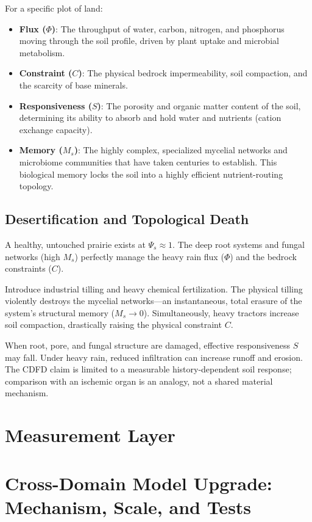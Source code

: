 \documentclass[11pt,a4paper]{article}
\begin{document}
For a specific plot of land:
\begin{itemize}
    \item \textbf{Flux ($\Phi$)}: The throughput of water, carbon, nitrogen, and phosphorus moving through the soil profile, driven by plant uptake and microbial metabolism.
    \item \textbf{Constraint ($C$)}: The physical bedrock impermeability, soil compaction, and the scarcity of base minerals.
    \item \textbf{Responsiveness ($S$)}: The porosity and organic matter content of the soil, determining its ability to absorb and hold water and nutrients (cation exchange capacity).
    \item \textbf{Memory ($M_s$)}: The highly complex, specialized mycelial networks and microbiome communities that have taken centuries to establish. This biological memory locks the soil into a highly efficient nutrient-routing topology.
\end{itemize}

\subsection{Desertification and Topological Death}
A healthy, untouched prairie exists at $\Psi_s \approx 1$. The deep root systems and fungal networks (high $M_s$) perfectly manage the heavy rain flux ($\Phi$) and the bedrock constraints ($C$).

Introduce industrial tilling and heavy chemical fertilization. The physical tilling violently destroys the mycelial networks---an instantaneous, total erasure of the system's structural memory ($M_s \to 0$). Simultaneously, heavy tractors increase soil compaction, drastically raising the physical constraint $C$.

When root, pore, and fungal structure are damaged, effective responsiveness $S$ may fall. Under heavy rain, reduced infiltration can increase runoff and erosion. The CDFD claim is limited to a measurable history-dependent soil response; comparison with an ischemic organ is an analogy, not a shared material mechanism.



\section{Measurement Layer}

\section{Cross-Domain Model Upgrade: Mechanism, Scale, and Tests}
\end{document}
